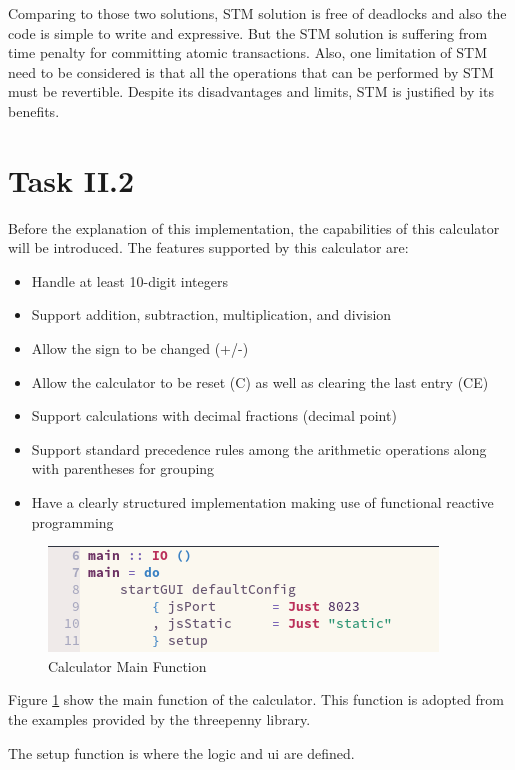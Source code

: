 \documentclass{article}
\begin{document}
\begin{normalsize}
  Comparing to those two solutions, STM solution is free of deadlocks and also
  the code is simple to write and expressive. But the STM solution is suffering
  from time penalty for committing atomic transactions. Also, one limitation of
  STM need to be considered is that all the operations that can be performed by
  STM must be revertible. Despite its disadvantages and limits, STM is justified
  by its benefits.

  \section{Task II.2}
  Before the explanation of this implementation, the capabilities of this
  calculator will be introduced. The features supported by this calculator are:
  \begin{itemize}
  \item{Handle at least 10-digit integers}
  \item{Support addition, subtraction, multiplication, and division}
  \item{Allow the sign to be changed (+/-)}
  \item{Allow the calculator to be reset (C) as well as clearing the last
      entry (CE)}
  \item{Support calculations with decimal fractions (decimal point)}
  \item{Support standard precedence rules among the arithmetic operations
  along with parentheses for grouping}
  \item{Have a clearly structured implementation making use of functional
      reactive programming}
  \end{itemize}

  
  \begin{figure}[H]
    \centering
    \centerline{\includegraphics[scale=0.4]{calcmain}}
    \caption{Calculator Main Function}
    \label{fig:calcmain}
  \end{figure}

  Figure \ref{fig:calcmain} show the main function of the calculator. This
  function is adopted from the examples provided by the threepenny library.

  The setup function is where the logic and ui are defined.


\end{normalsize}
\end{document}

